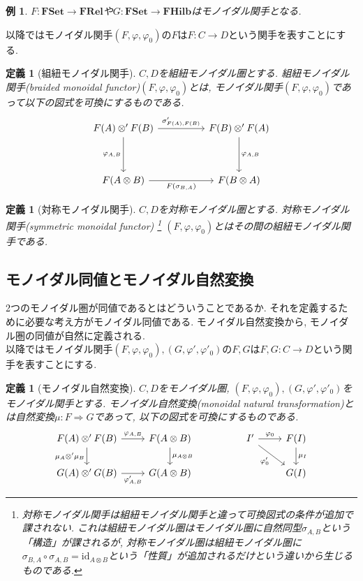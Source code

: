 \documentclass[a4paper,12pt]{ltjsarticle}
\theoremstyle{break}
\newtheorem{defn}[thm]{定義}
\newtheorem{eg}[thm]{例}
\newcommand{\fset}{\mathbf{FSet}}
\newcommand{\frel}{\mathbf{FRel}}
\newcommand{\fhilb}{\mathbf{FHilb}}
\newcommand{\id}{\mathrm{id}}
\newcommand{\ci}{\circ}
\newcommand{\si}{\sigma}
\newcommand{\vp}{\varphi}
\newcommand{\ra}{\Rightarrow}
\newcommand{\ot}{\otimes}
\numberwithin{equation}{section}
\begin{document}
\begin{eg}
  $F: \fset \to \frel$や$G: \fset \to \fhilb$はモノイダル関手となる. 
\end{eg}

以降ではモノイダル関手$(F,\vp,\vp_0)$の$F$は$F: C \to D$という関手を表すことにする. 

\begin{defn}[組紐モノイダル関手]
  $C,D$を組紐モノイダル圏とする. 
  組紐モノイダル関手(braided monoidal functor)$(F,\vp,\vp_0)$とは, モノイダル関手$(F,\vp,\vp_0)$であって以下の図式を可換にするものである. 
  \[\begin{tikzcd}
    {F(A) \ot' F(B)} && {F(B) \ot' F(A)} \\
    \\
    {F(A \ot B)} && {F(B \ot A)}
    \arrow["{\si_{F(A),F(B)}'}", from=1-1, to=1-3]
    \arrow["{\vp_{A,B}}"', from=1-1, to=3-1]
    \arrow["{F(\si_{B,A})}"', from=3-1, to=3-3]
    \arrow["{\vp_{A,B}}", from=1-3, to=3-3]
  \end{tikzcd}\]
\end{defn}

\begin{defn}[対称モノイダル関手]
  $C,D$を対称モノイダル圏とする. 
  対称モノイダル関手(symmetric monoidal functor)
  \footnote{
    対称モノイダル関手は組紐モノイダル関手と違って可換図式の条件が追加で課されない. 
    これは組紐モノイダル圏はモノイダル圏に自然同型$\si_{A,B}$という「構造」が課されるが, 対称モノイダル圏は組紐モノイダル圏に$\si_{B,A} \ci \si_{A,B} = \id_{A \ot B}$という「性質」が追加されるだけという違いから生じるものである. 
  }
  $(F,\vp,\vp_0)$とはその間の組紐モノイダル関手である. 
\end{defn}

\subsection{モノイダル同値とモノイダル自然変換}

2つのモノイダル圏が同値であるとはどういうことであるか. 
それを定義するために必要な考え方がモノイダル同値である. 
モノイダル自然変換から, モノイダル圏の同値が自然に定義される. \\

以降ではモノイダル関手$(F,\vp,\vp_0),(G,\vp',\vp'_0)$の$F,G$は$F,G: C \to D$という関手を表すことにする.

\begin{defn}[モノイダル自然変換]
  $C,D$をモノイダル圏, $(F,\vp,\vp_0),(G,\vp',\vp'_0)$をモノイダル関手とする. 
  モノイダル自然変換(monoidal natural transformation)とは自然変換$\mu: F \ra G$であって, 以下の図式を可換にするものである. 
  \[\begin{tikzcd}
    {F(A) \ot' F(B)} & {F(A \ot B)} && {I'} & {F(I)} \\
    {G(A) \ot' G(B)} & {G(A \ot B)} &&& {G(I)}
    \arrow["{\mu_A \ot' \mu_B}"', from=1-1, to=2-1]
    \arrow["{\vp_{A,B}}", from=1-1, to=1-2]
    \arrow["{\mu_{A \ot B}}", from=1-2, to=2-2]
    \arrow["{\vp_{A,B}'}"', from=2-1, to=2-2]
    \arrow["{\vp_0}", from=1-4, to=1-5]
    \arrow["{\mu_I}", from=1-5, to=2-5]
    \arrow["{\vp_0'}"', from=1-4, to=2-5]
  \end{tikzcd}\]
\end{defn}
\end{document}
